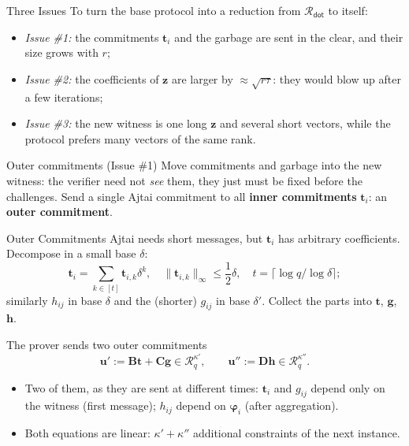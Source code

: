 \documentclass{zkdl-presentation-template}
\begin{document}
    \begin{frame}{Three Issues}
        To turn the base protocol into a reduction from $\mathcal{R}_{\mathsf{dot}}$ to itself:
        \begin{itemize}
            \item \textit{Issue \#1:} the commitments $\mathbf{t}_i$ and the garbage are sent in the clear, and their size grows with $r$;\pause
            \item \textit{Issue \#2:} the coefficients of $\mathbf{z}$ are larger by $\approx \sqrt{r\tau}$: they would blow up after a few iterations;\pause
            \item \textit{Issue \#3:} the new witness is one long $\mathbf{z}$ and several short vectors, while the protocol prefers many vectors of the same rank.
        \end{itemize}
        \pause

        \begin{block}{Outer commitments (Issue \#1)}
            Move commitments and garbage into the new witness: the verifier need not \emph{see} them, they just must be fixed before the challenges. Send a single Ajtai commitment to all \textbf{inner commitments} $\mathbf{t}_i$: an \textbf{outer commitment}.
        \end{block}
    \end{frame}

    \begin{frame}{Outer Commitments}
        Ajtai needs short messages, but $\mathbf{t}_i$ has arbitrary coefficients. Decompose in a small base $\delta$:
        \begin{equation*}
            \mathbf{t}_i = \sum_{k \in [t]} \mathbf{t}_{i,k}\delta^k, \quad \|\mathbf{t}_{i,k}\|_{\infty} \leq \frac{1}{2}\delta, \quad t = \lceil \log q/\log \delta \rceil;
        \end{equation*}
        similarly $h_{ij}$ in base $\delta$ and the (shorter) $g_{ij}$ in base $\delta'$. Collect the parts into $\mathbf{t}$, $\mathbf{g}$, $\mathbf{h}$.
        \pause

        The prover sends two outer commitments
        \begin{equation*}
            \mathbf{u}' := \mathbf{B}\mathbf{t} + \mathbf{C}\mathbf{g} \in \mathcal{R}_q^{\kappa'}, \qquad \mathbf{u}'' := \mathbf{D}\mathbf{h} \in \mathcal{R}_q^{\kappa''}.
        \end{equation*}
        \pause
        \vspace{-10pt}

        \begin{itemize}
            \item Two of them, as they are sent at different times: $\mathbf{t}_i$ and $g_{ij}$ depend only on the witness (first message); $h_{ij}$ depend on $\boldsymbol{\varphi}_i$ (after aggregation).
            \item Both equations are linear: $\kappa' + \kappa''$ additional constraints of the next instance.
        \end{itemize}
    \end{frame}
\end{document}
